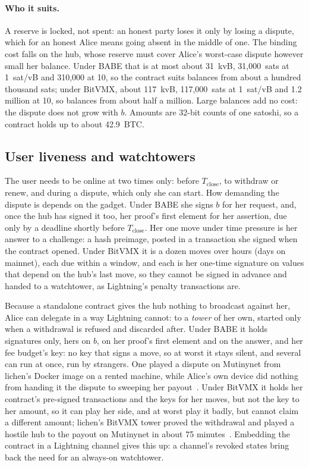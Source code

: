 \documentclass[11pt]{article}
\newcommand{\Tc}{T_{\mathrm{close}}}
\begin{document}
\paragraph{Who it suits.} A reserve is locked, not spent: an honest
party loses it only by losing a dispute, which for an honest Alice means
going absent in the middle of one. The binding cost falls on the hub,
whose reserve must cover Alice's worst-case dispute however small her
balance. Under BABE that is at most about 31~kvB, 31,000~sats at
1~sat/vB and 310,000 at 10, so the contract suits balances from about a
hundred thousand sats; under BitVMX, about 117~kvB, 117,000~sats at
1~sat/vB and 1.2 million at 10, so balances from about half a million. Large balances add no cost: the dispute does not grow
with $b$. Amounts are 32-bit counts of one satoshi, so a contract holds
up to about 42.9~BTC.

\subsection{User liveness and watchtowers}
\label{sec:watch}

The user needs to be online at two times only: before $\Tc$, to withdraw or
renew, and during a dispute, which only she can start. How demanding the
dispute is depends on the gadget. Under BABE she signs $b$ for her
request, and, once the hub has signed it too, her proof's first element
for her assertion, due only by a deadline shortly before $\Tc$. Her one
move under time pressure is her answer to a challenge: a hash preimage,
posted in a transaction she signed when the contract opened. Under
BitVMX it is a dozen moves over hours (days on mainnet), each due within
a window, and each is her one-time signature on values that depend on
the hub's last move, so they cannot be signed in advance and handed to a
watchtower, as Lightning's penalty transactions are.

Because a standalone contract gives the hub nothing to broadcast against
her, Alice can delegate in a way Lightning cannot: to a \emph{tower} of
her own, started only when a withdrawal is refused and discarded after.
Under BABE it holds signatures only, hers on $b$, on her proof's first
element and on the answer, and her fee budget's key: no key that signs a
move, so at worst it stays silent, and several can run at once, run by
strangers. One played a dispute on Mutinynet from lichen's Docker image
on a rented machine, while Alice's own device did nothing from handing it
the dispute to sweeping her payout~\cite[\S 7]{lichenbabe}. Under BitVMX
it holds her contract's pre-signed transactions and the keys for her
moves, but not the key to her amount, so it can play her side, and at
worst play it badly, but cannot claim a different amount; lichen's
BitVMX tower proved the withdrawal and played a hostile hub to the payout
on Mutinynet in about 75 minutes~\cite[\S 10]{lichenbitvmx}. Embedding
the contract in a Lightning channel gives this up: a channel's revoked
states bring back the need for an always-on watchtower.
\end{document}
